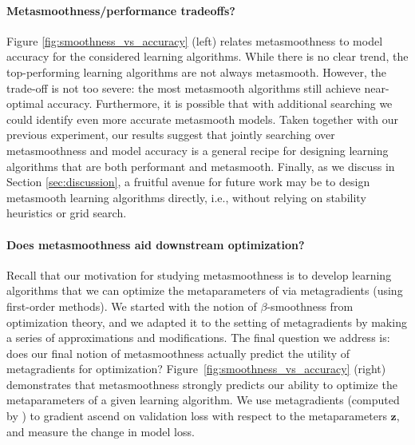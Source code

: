 \paragraph{Metasmoothness/performance tradeoffs?}
Figure \ref{fig:smoothness_vs_accuracy} (left) relates
metasmoothness to model accuracy for the considered learning algorithms.
While there is no clear trend, the top-performing
learning algorithms are not always metasmooth.
However, the trade-off is not too severe: the most metasmooth
algorithms still achieve near-optimal accuracy. Furthermore, it is possible
that with additional searching we could identify even more accurate metasmooth
models.
Taken together with our previous experiment, our results suggest that
jointly searching
over metasmoothness and model accuracy is a general recipe for designing
learning algorithms that are both performant and metasmooth.
Finally, as we discuss in Section \ref{sec:discussion},
a fruitful avenue for future work may be to
design metasmooth learning algorithms directly,
i.e., without relying on stability heuristics or grid search.


\paragraph{Does metasmoothness aid downstream optimization?}
Recall that our motivation for studying metasmoothness is to develop learning
algorithms that we can optimize the metaparameters of via metagradients (using
first-order methods). We started with the notion of $\beta$-smoothness from
optimization theory, and we adapted it to the setting of metagradients by making
a series of approximations and modifications. The final question we address is:
does our final notion of metasmoothness actually predict the utility of
metagradients for optimization? Figure~\ref{fig:smoothness_vs_accuracy}
(right) demonstrates
that metasmoothness strongly predicts our ability to optimize the
metaparameters of a
given learning algorithm. We use metagradients (computed by
\replay{}) to gradient
ascend on validation loss with respect to the metaparameters $\mathbf{z}$, and
measure the change in model loss.


